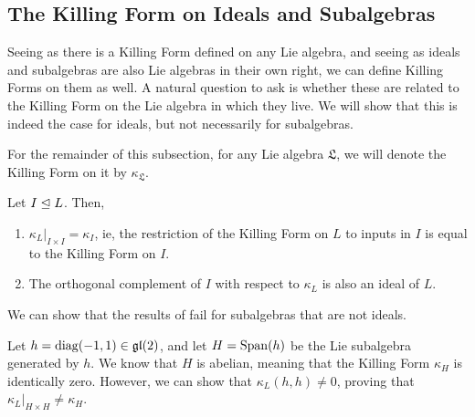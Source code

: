 \subsection{The Killing Form on Ideals and Subalgebras}

Seeing as there is a Killing Form defined on any Lie algebra, and seeing as ideals and subalgebras are also Lie algebras in their own right, we can define Killing Forms on them as well. A natural question to ask is whether these are related to the Killing Form on the Lie algebra in which they live. We will show that this is indeed the case for ideals, but not necessarily for subalgebras.

For the remainder of this subsection, for any Lie algebra $\mathfrak{L}$, we will denote the Killing Form on it by $\kappa_{\mathfrak{L}}$.

\begin{boxproposition}\label{Ch2:Prop:KillingIdeal}
    Let $I \trianglelefteq L$. Then,
    \begin{enumerate}[label = \normalfont \arabic*.]
        \item $\kappa_L\vert_{I \times I} = \kappa_{I}$, ie, the restriction of the Killing Form on $L$ to inputs in $I$ is equal to the Killing Form on $I$.
        \item The orthogonal complement of $I$ with respect to $\kappa_L$ is also an ideal of $L$.
    \end{enumerate}
\end{boxproposition}

We can show that the results of  fail for subalgebras that are not ideals.

\begin{boxcexample}
    Let $h = \operatorname{diag}\!\left( -1, 1 \right) \in \mathfrak{gl}\!\left( 2 \right)$, and let $H = \operatorname{Span}\!\left( h \right)$ be the Lie subalgebra generated by $h$. We know that $H$ is abelian, meaning that the Killing Form $\kappa_H$ is identically zero. However, we can show that $\kappa_L(h, h) \neq 0$, proving that $\kappa_L\vert_{H \times H} \neq \kappa_H$.
\end{boxcexample}
